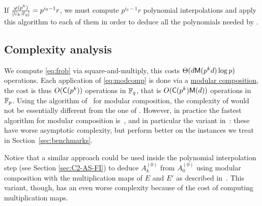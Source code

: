 If $\frac{\varphi(p^k)}{[\mathbb{U}_k:\mathbb{F}_q]} = p^{i_0-1}r$, we must compute
$p^{i_0-1}r$ polynomial interpolations and apply this algorithm to
each of them in order to deduce all the polynomials needed by \ctwo{}.


\subsection{Complexity analysis}
We compute \eqref{eq:frob} via square-and-multiply, this costs
$\Theta(d\mathsf{M}(p^kd)\log p)$ operations. Each application of
\eqref{eq:modcomp} is done via a
\hyperref[sec:modular-composition]{modular composition}, the cost is
thus $O(\mathsf{C}(p^k))$ operations in $\mathbb{F}_q$, that is
$O(\mathsf{C}(p^k)\mathsf{M}(d))$ operations in $\mathbb{F}_p$. Using the algorithm
of~\cite{kedlaya+umans08} for modular composition, the complexity of
\ctwoasfimc{} would not be essentially different from the one of
\ctwoasfi{}. However, in practice the fastest algorithm for modular
composition is~\cite{brent+kung}, and in particular the variant
in~\cite[Lemma~3]{kaltofen+shoup98}: these have worse asymptotic
complexity, but perform better on the instances we treat in
Section~\ref{sec:benchmarks}.

Notice that a similar approach could be used inside the polynomial
interpolation step (see Section \ref{sec:C2-AS-FI}) to deduce
$A_k^{(0)}$ from $A_0^{(0)}$ using modular composition with the
multiplication maps of $E$ and $E'$ as described
in~\cite[$\S$2.3]{couveignes96}. This variant, though, has an even
worse complexity because of the cost of computing multiplication maps.




%
